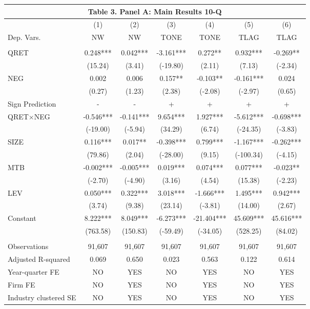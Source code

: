 \begin{table}[htbp] \label{T3PA}
  \centering
    \begin{tabular}{lcccccc}
    \multicolumn{7}{c}{\textbf{Table 3. Panel A: Main Results 10-Q}} \\
    \midrule
    \midrule
      & (1) & (2) & (3) & (4) & (5) & (6) \\
    Dep. Vars. & NW & NW & TONE & TONE & TLAG & TLAG \\
    \midrule
      &   &   &   &   &   &  \\
    QRET & 0.248*** & 0.042*** & -3.161*** & 0.272** & 0.932*** & -0.269** \\
      & (15.24) & (3.41) & (-19.80) & (2.11) & (7.13) & (-2.34) \\
    NEG & 0.002 & 0.006 & 0.157** & -0.103** & -0.161*** & 0.024 \\
      & (0.27) & (1.23) & (2.38) & (-2.08) & (-2.97) & (0.65) \\
    \rowcolor[rgb]{ .933,  .925,  .882} Sign Prediction & - & - & + & + & + & + \\
    \rowcolor[rgb]{ .933,  .925,  .882} QRET$\times$NEG & -0.546*** & -0.141*** & 9.654*** & 1.927*** & -5.612*** & -0.698*** \\
    \rowcolor[rgb]{ .933,  .925,  .882}   & (-19.00) & (-5.94) & (34.29) & (6.74) & (-24.35) & (-3.83) \\
    SIZE & 0.116*** & 0.017** & -0.398*** & 0.799*** & -1.167*** & -0.262*** \\
      & (79.86) & (2.04) & (-28.00) & (9.15) & (-100.34) & (-4.15) \\
    MTB & -0.002*** & -0.005*** & 0.019*** & 0.074*** & 0.077*** & -0.023** \\
      & (-2.70) & (-4.90) & (3.16) & (4.54) & (15.38) & (-2.23) \\
    LEV & 0.050*** & 0.322*** & 3.018*** & -1.666*** & 1.495*** & 0.942*** \\
      & (3.74) & (9.38) & (23.14) & (-3.81) & (14.00) & (2.67) \\
    Constant & 8.222*** & 8.049*** & -6.273*** & -21.404*** & 45.609*** & 45.616*** \\
      & (763.58) & (150.83) & (-59.49) & (-34.05) & (528.25) & (84.02) \\
      &   &   &   &   &   &  \\
    Observations & 91,607 & 91,607 & 91,607 & 91,607 & 91,607 & 91,607 \\
    Adjusted R-squared & 0.069 & 0.650 & 0.023 & 0.563 & 0.122 & 0.614 \\
    Year-quarter FE & NO & YES & NO & YES & NO & YES \\
    Firm FE & NO & YES & NO & YES & NO & YES \\
    Industry clustered SE & NO & YES & NO & YES & NO & YES \\
    \bottomrule
    \bottomrule
    \end{tabular}%
\end{table}%
